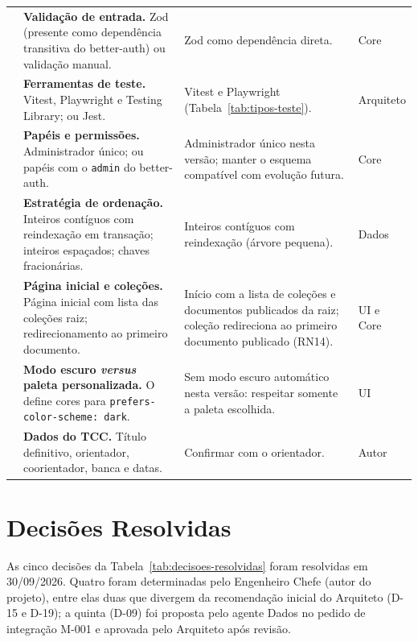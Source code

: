 \begin{longtable}{@{}L{1.1cm}L{6.3cm}L{4.5cm}L{1.9cm}@{}}
 & \textbf{Validação de entrada.} Zod (presente como dependência transitiva do better-auth) ou validação manual. & Zod como dependência direta. & Core\\[1pt]
 & \textbf{Ferramentas de teste.} Vitest, Playwright e Testing Library; ou Jest. & Vitest e Playwright (Tabela~\ref{tab:tipos-teste}). & Arquiteto\\[1pt]
 & \textbf{Papéis e permissões.} Administrador único; ou papéis com o  \texttt{admin} do better-auth. & Administrador único nesta versão; manter o esquema compatível com evolução futura. & Core\\[1pt]
 & \textbf{Estratégia de ordenação.} Inteiros contíguos com reindexação em transação; inteiros espaçados; chaves fracionárias. & Inteiros contíguos com reindexação (árvore pequena). & Dados\\[1pt]
 & \textbf{Página inicial e coleções.} Página inicial com lista das coleções raiz; redirecionamento ao primeiro documento. & Início com a lista de coleções e documentos publicados da raiz; coleção redireciona ao primeiro documento publicado (RN14). & UI e Core\\[1pt]
 & \textbf{Modo escuro \emph{versus} paleta personalizada.} O  define cores para \texttt{prefers-color-scheme: dark}. & Sem modo escuro automático nesta versão: respeitar somente a paleta escolhida. & UI\\[1pt]
 & \textbf{Dados do TCC.} Título definitivo, orientador, coorientador, banca e datas. & Confirmar com o orientador. & Autor\\[1pt]
\end{longtable}

\section{Decisões Resolvidas}\label{sec:decisoes-resolvidas}

As cinco decisões da Tabela~\ref{tab:decisoes-resolvidas} foram resolvidas em 30/09/2026. Quatro foram determinadas pelo Engenheiro Chefe (autor do projeto), entre elas duas que divergem da recomendação inicial do Arquiteto (D-15 e D-19); a quinta (D-09) foi proposta pelo agente Dados no pedido de integração M-001 e aprovada pelo Arquiteto após revisão.

